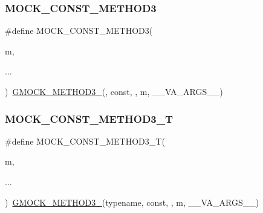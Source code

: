 \mbox{\label{_obj__test_2lib_2googletest-release-1_88_81_2googlemock_2include_2gmock_2gmock-generated-function-mockers_8h_a9e67763df6705172e1a2ae92f1446bbc}} 
\subsubsection{\texorpdfstring{MOCK\_CONST\_METHOD3}{MOCK\_CONST\_METHOD3}}
{\footnotesize\ttfamily \#define M\+O\+C\+K\+\_\+\+C\+O\+N\+S\+T\+\_\+\+M\+E\+T\+H\+O\+D3(\begin{DoxyParamCaption}\item[{}]{m,  }\item[{}]{... }\end{DoxyParamCaption})~\mbox{\hyperlink{_obj__test_2lib_2googletest-release-1_88_81_2googlemock_2include_2gmock_2gmock-generated-function-mockers_8h_af7c77ba511c631de02bb8c45a6ed3045}{G\+M\+O\+C\+K\+\_\+\+M\+E\+T\+H\+O\+D3\+\_\+}}(, const, , m, \+\_\+\+\_\+\+V\+A\+\_\+\+A\+R\+G\+S\+\_\+\+\_\+)}

\mbox{\label{_obj__test_2lib_2googletest-release-1_88_81_2googlemock_2include_2gmock_2gmock-generated-function-mockers_8h_a4c4c3417c197729f647fb0c700a41405}} 
\subsubsection{\texorpdfstring{MOCK\_CONST\_METHOD3\_T}{MOCK\_CONST\_METHOD3\_T}}
{\footnotesize\ttfamily \#define M\+O\+C\+K\+\_\+\+C\+O\+N\+S\+T\+\_\+\+M\+E\+T\+H\+O\+D3\+\_\+T(\begin{DoxyParamCaption}\item[{}]{m,  }\item[{}]{... }\end{DoxyParamCaption})~\mbox{\hyperlink{_obj__test_2lib_2googletest-release-1_88_81_2googlemock_2include_2gmock_2gmock-generated-function-mockers_8h_af7c77ba511c631de02bb8c45a6ed3045}{G\+M\+O\+C\+K\+\_\+\+M\+E\+T\+H\+O\+D3\+\_\+}}(typename, const, , m, \+\_\+\+\_\+\+V\+A\+\_\+\+A\+R\+G\+S\+\_\+\+\_\+)}

